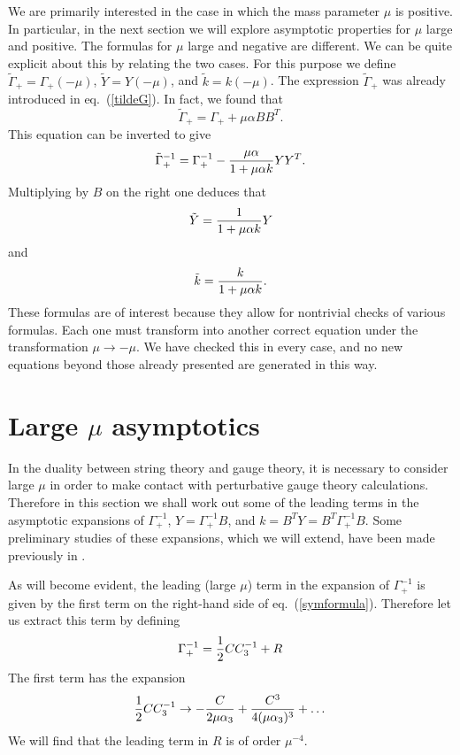 \documentclass[a4paper,12pt]{article}
\begin{document}
We are primarily interested in the case in which the mass
parameter $\mu$ is positive. In particular, in the next section we
will explore asymptotic properties for $\mu$ large and positive.
The formulas for $\mu$ large and negative are different. We can be
quite explicit about this by relating the two cases. For this
purpose we define $\tilde\Gamma_+ = \Gamma_+(-\mu)$, $\tilde Y=
Y(-\mu)$, and $\tilde k = k(-\mu)$. The expression
$\tilde\Gamma_+$ was already introduced in eq.~(\ref{tildeG}). In
fact, we found that
\begin{equation}
\tilde\Gamma_+ = \Gamma_+ + \mu \alpha BB^T.
\end{equation}
This equation can be inverted to give
\begin{equation}
\tilde\Gamma_+^{-1} = \Gamma_+^{-1} - {\mu \alpha \over 1 + \mu
\alpha k} YY^T.
\end{equation}
Multiplying by $B$ on the right one deduces that
\begin{equation}
\tilde Y = {1 \over 1 + \mu \alpha k} Y
\end{equation}
and
\begin{equation}
\tilde k = {k \over 1 + \mu \alpha k} .
\end{equation}
These formulas are of interest because they allow for nontrivial
checks of various formulas. Each one must transform into another
correct equation under the transformation $\mu \to - \mu$. We have
checked this in every case, and no new equations beyond those
already presented are generated in this way.

\section{Large $\mu$ asymptotics}

In the duality between string theory and gauge theory, it is
necessary to consider large $\mu$ in order to make contact with
perturbative gauge theory calculations. Therefore in this section
we shall work out some of the leading terms in the asymptotic
expansions of $\Gamma_+^{-1}$, $Y = \Gamma_+^{-1}B$, and $k = B^T
Y =B^T\Gamma_+^{-1}B$. Some preliminary studies of these
expansions, which we will extend, have been made previously in
\cite{Huang:2002wf} \cite{Spradlin:2002rv} \cite{Klebanov:2002mp}.

As will become evident, the leading (large $\mu$) term in the
expansion of $\Gamma_+^{-1}$ is given by the first term on the
right-hand side of eq.~(\ref{symformula}). Therefore let us
extract this term by defining
\begin{equation} \label{decomp}
\Gamma_+^{-1} = {1 \over 2} C C_3^{-1} + R
\end{equation}
The first term has the expansion
\begin{equation}
{1 \over 2} C C_3^{-1} \to - {C \over 2 \mu \alpha_3} + {C^3 \over
4 (\mu \alpha_3)^3} + \dots
\end{equation}
We will find that the leading term in $R$ is of order $\mu^{-4}$.
\end{document}
